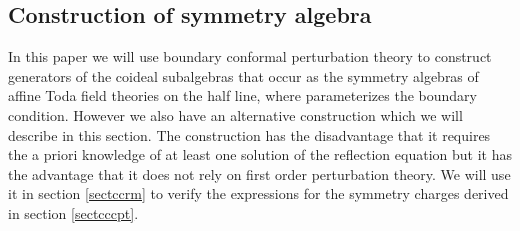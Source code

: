 \documentclass[a4paper,12pt]{article}
\providecommand{\uqgh}{U_q(\hat{g})}
\providecommand{\sa}{{\mathcal{B}}}
\numberwithin{equation}{section}
\begin{document}
\subsection{Construction of symmetry algebra\label{sectcsa}}

In this paper we will use boundary conformal perturbation theory
to construct generators of the coideal subalgebras
\myHighlight{$\sa_\epsilon\subset\uqgh$}\coordHE{} that occur as the symmetry algebras of
affine Toda field theories on the half line, where \myHighlight{$\epsilon$}\coordHE{}
parameterizes the boundary condition. However we also have an
alternative construction which we will describe in this section.
The construction has the disadvantage that it requires the a
priori knowledge of at least one solution of the reflection
equation but it has the advantage that it does not rely on first
order perturbation theory. We will use it in section
\ref{sectccrm} to verify the expressions for the symmetry charges
derived in section \ref{sectcccpt}.
\end{document}
